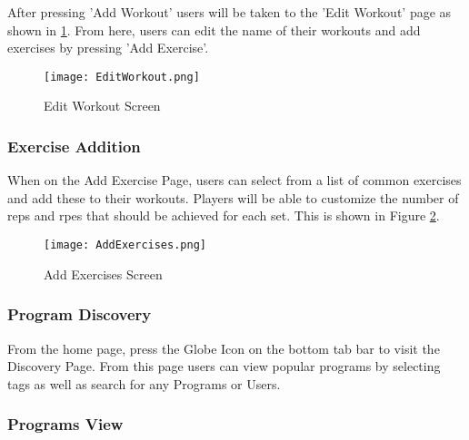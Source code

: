 \documentclass{article}
\begin{document}
After pressing 'Add Workout' users will be taken to the 'Edit Workout' page as shown in \ref{FigEditWorkout}. From here, users can edit the name of their workouts and add exercises by pressing 'Add Exercise'.\\

\begin{figure}[H]
    \centering
    \texttt{[image: EditWorkout.png]}
    \caption{Edit Workout Screen}
    \label{FigEditWorkout}
    \end{figure}

\subsubsection{Exercise Addition}

When on the Add Exercise Page, users can select from a list of common exercises and add these to their workouts. Players will be able to customize the number of reps and rpes that should be achieved for each set. This is shown in Figure \ref{FigAddExercises}.

\begin{figure}[H]
    \centering
    \texttt{[image: AddExercises.png]}
    \caption{Add Exercises Screen}
    \label{FigAddExercises}
    \end{figure}

\subsubsection{Program Discovery}

From the home page, press the Globe Icon on the bottom tab bar to visit the Discovery Page. From this page users can view popular programs by selecting tags as well as search for any Programs or Users.

\subsubsection{Programs View}
\end{document}
